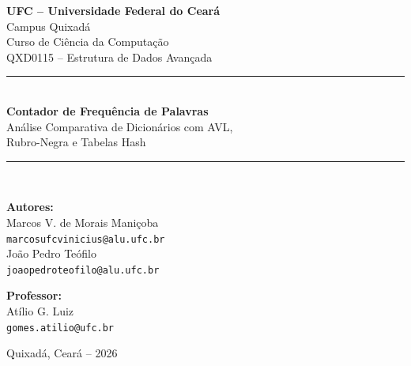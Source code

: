 \documentclass[12pt, a4paper]{article}
\begin{document}
\begin{titlepage}
    \centering

    {\Large \textbf{UFC -- Universidade Federal do Ceará}}\\[0.3cm]
    {\large Campus Quixadá}\\
    {\large Curso de Ciência da Computação}\\[1.5cm]

    {\large QXD0115 -- Estrutura de Dados Avançada}\\[0.5cm]

    \rule{\linewidth}{0.5mm}\\[0.4cm]
    {\LARGE \textbf{Contador de Frequência de Palavras}}\\[0.2cm]
    {\large Análise Comparativa de Dicionários com AVL,}\\
    {\large Rubro-Negra e Tabelas Hash}\\
    \rule{\linewidth}{0.5mm}\\[1.5cm]

    \begin{minipage}{0.5\textwidth}
        \begin{flushleft}
            \textbf{Autores:}\\
            Marcos V. de Morais Maniçoba\\
            \texttt{marcosufcvinicius@alu.ufc.br}\\[0.3cm]
            João Pedro Teófilo\\
            \texttt{joaopedroteofilo@alu.ufc.br}
        \end{flushleft}
    \end{minipage}
    \begin{minipage}{0.45\textwidth}
        \begin{flushright}
            \textbf{Professor:}\\
            Atílio G. Luiz\\
            \texttt{gomes.atilio@ufc.br}
        \end{flushright}
    \end{minipage}

    \vfill
    {\large Quixadá, Ceará -- 2026}
\end{titlepage}

\tableofcontents
\newpage
\end{document}
